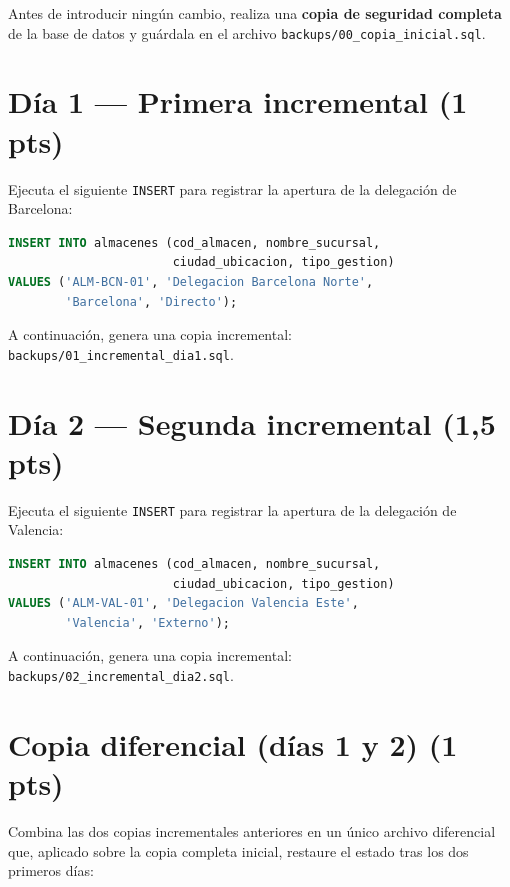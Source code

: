 \documentclass[a4paper,11pt]{article}
\begin{document}
\begin{Form}
Antes de introducir ningún cambio, realiza una \textbf{copia de seguridad completa} de la base de datos y guárdala en el archivo \texttt{backups/00\_copia\_inicial.sql}.

\section{Día 1 — Primera incremental \textnormal{(1 pts)}}

Ejecuta el siguiente \texttt{INSERT} para registrar la apertura de la delegación de Barcelona:

\begin{lstlisting}[language=SQL]
INSERT INTO almacenes (cod_almacen, nombre_sucursal,
                       ciudad_ubicacion, tipo_gestion)
VALUES ('ALM-BCN-01', 'Delegacion Barcelona Norte',
        'Barcelona', 'Directo');
\end{lstlisting}

A continuación, genera una copia incremental: \texttt{backups/01\_incremental\_dia1.sql}.

\section{Día 2 — Segunda incremental \textnormal{(1,5 pts)}}

Ejecuta el siguiente \texttt{INSERT} para registrar la apertura de la delegación de Valencia:

\begin{lstlisting}[language=SQL]
INSERT INTO almacenes (cod_almacen, nombre_sucursal,
                       ciudad_ubicacion, tipo_gestion)
VALUES ('ALM-VAL-01', 'Delegacion Valencia Este',
        'Valencia', 'Externo');
\end{lstlisting}

A continuación, genera una copia incremental: \texttt{backups/02\_incremental\_dia2.sql}.


\section{Copia diferencial (días 1 y 2) \textnormal{(1 pts)}}

Combina las dos copias incrementales anteriores en un único archivo diferencial que, aplicado sobre la copia completa inicial, restaure el estado tras los dos primeros días:


\end{Form}
\end{document}
